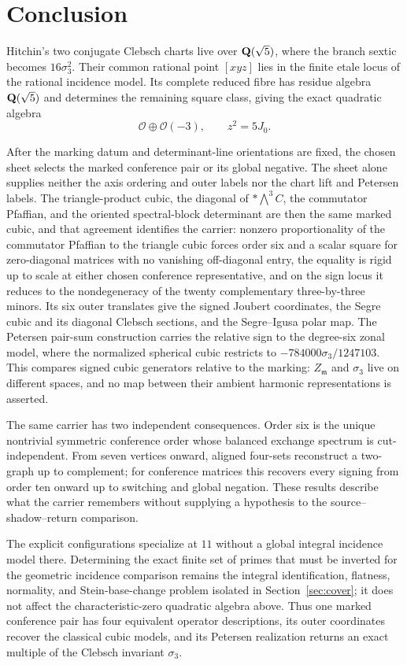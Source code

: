 \section{Conclusion}

Hitchin's two conjugate Clebsch charts live over \(\mathbf Q(\sqrt5)\), where the
branch sextic becomes \(16\sigma_3^2\).  Their common rational point
\([xyz]\) lies in the finite etale locus of the rational incidence model.
Its complete reduced fibre has residue algebra \(\mathbf Q(\sqrt5)\) and determines
the remaining square class, giving the exact quadratic algebra
\[
 \mathcal O\oplus\mathcal O(-3),\qquad z^2=5J_0.
\]

After the marking datum and determinant-line orientations are fixed,
the chosen sheet selects the marked conference pair or its global negative.  The
sheet alone supplies neither the axis ordering and outer labels nor the chart
lift and Petersen labels.  The triangle-product cubic, the diagonal of
\(*\!\bigwedge^3C\), the commutator Pfaffian, and the oriented
spectral-block determinant
are then the same marked cubic, and that agreement identifies the carrier:
nonzero proportionality of the commutator Pfaffian to the triangle cubic
forces order six and a scalar square for zero-diagonal matrices with no
vanishing off-diagonal entry, the equality is rigid up to scale at either
chosen conference representative, and on the sign locus it reduces to the nondegeneracy of the
twenty complementary three-by-three minors.  Its six outer translates give the signed
Joubert coordinates, the Segre cubic and its diagonal Clebsch sections, and
the Segre--Igusa polar map.  The Petersen pair-sum construction carries the
relative sign to the degree-six zonal model, where the normalized
spherical cubic restricts to
\(-784000\sigma_3/1247103\).  This compares signed cubic generators relative to
the marking: \(Z_{\mathfrak m}\) and \(\sigma_3\) live on different spaces,
and no map between their ambient harmonic representations is asserted.

The same carrier has two independent consequences.  Order six is the unique
nontrivial symmetric conference order whose balanced exchange spectrum is
cut-independent.  From seven vertices onward, aligned four-sets reconstruct a
two-graph up to complement; for conference matrices this recovers every
signing from order ten onward up to switching and global negation.  These
results describe what the carrier remembers without supplying a hypothesis to
the source--shadow--return comparison.

The explicit configurations specialize at \(11\) without a global integral
incidence model there.  Determining the exact finite set of primes that must be
inverted for the geometric incidence comparison remains the integral
identification, flatness, normality, and Stein-base-change problem isolated in
Section~\ref{sec:cover}; it does not affect the characteristic-zero quadratic
algebra above.  Thus one marked conference pair has four equivalent operator
descriptions, its outer coordinates recover the classical cubic models, and
its Petersen realization returns an exact multiple of the Clebsch invariant
\(\sigma_3\).
